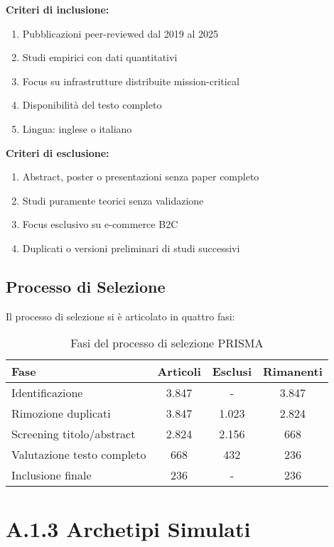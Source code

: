 \textbf{Criteri di inclusione:}
\begin{enumerate}
    \item Pubblicazioni peer-reviewed dal 2019 al 2025
    \item Studi empirici con dati quantitativi
    \item Focus su infrastrutture distribuite mission-critical
    \item Disponibilità del testo completo
    \item Lingua: inglese o italiano
\end{enumerate}

\textbf{Criteri di esclusione:}
\begin{enumerate}
    \item Abstract, poster o presentazioni senza paper completo
    \item Studi puramente teorici senza validazione
    \item Focus esclusivo su e-commerce B2C
    \item Duplicati o versioni preliminari di studi successivi
\end{enumerate}

\subsection{\texorpdfstring{Processo di Selezione}{A.1.3 - Processo di Selezione}}

Il processo di selezione si è articolato in quattro fasi:

\begin{table}[htbp]
\centering
\caption{Fasi del processo di selezione PRISMA}
\begin{tabular}{|l|c|c|c|}
\hline
\textbf{Fase} & \textbf{Articoli} & \textbf{Esclusi} & \textbf{Rimanenti} \\
\hline
Identificazione & 3.847 & - & 3.847 \\
Rimozione duplicati & 3.847 & 1.023 & 2.824 \\
Screening titolo/abstract & 2.824 & 2.156 & 668 \\
Valutazione testo completo & 668 & 432 & 236 \\
Inclusione finale & 236 & - & 236 \\
\hline
\end{tabular}
\end{table}

\section{A.1.3 Archetipi Simulati}

